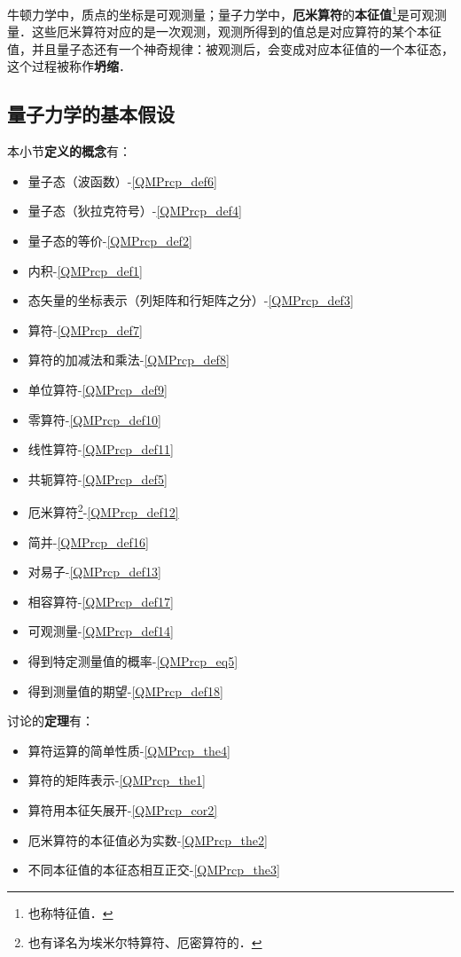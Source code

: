 牛顿力学中，质点的坐标是可观测量；量子力学中，\textbf{厄米算符}的\textbf{本征值}\footnote{也称特征值．}是可观测量．这些厄米算符对应的是一次观测，观测所得到的值总是对应算符的某个本征值，并且量子态还有一个神奇规律：被观测后，会变成对应本征值的一个本征态，这个过程被称作\textbf{坍缩}．



\subsection{量子力学的基本假设}\label{QMPrcp_sub2}

本小节\textbf{定义的概念}有：

\begin{itemize}
\item 量子态（波函数）-\autoref{QMPrcp_def6} 
\item 量子态（狄拉克符号）-\autoref{QMPrcp_def4} 
\item 量子态的等价-\autoref{QMPrcp_def2} 
\item 内积-\autoref{QMPrcp_def1} 
\item 态矢量的坐标表示（列矩阵和行矩阵之分）-\autoref{QMPrcp_def3} 
\item 算符-\autoref{QMPrcp_def7} 
\item 算符的加减法和乘法-\autoref{QMPrcp_def8} 
\item 单位算符-\autoref{QMPrcp_def9} 
\item 零算符-\autoref{QMPrcp_def10} 
\item 线性算符-\autoref{QMPrcp_def11} 
\item 共轭算符-\autoref{QMPrcp_def5} 
\item 厄米算符\footnote{也有译名为埃米尔特算符、厄密算符的．}-\autoref{QMPrcp_def12} 
\item 简并-\autoref{QMPrcp_def16} 
\item 对易子-\autoref{QMPrcp_def13} 
\item 相容算符-\autoref{QMPrcp_def17} 
\item 可观测量-\autoref{QMPrcp_def14} 
\item 得到特定测量值的概率-\autoref{QMPrcp_eq5} 
\item 得到测量值的期望-\autoref{QMPrcp_def18} 
\end{itemize}


讨论的\textbf{定理}有：

\begin{itemize}
\item 算符运算的简单性质-\autoref{QMPrcp_the4} 
\item 算符的矩阵表示-\autoref{QMPrcp_the1} 
\item 算符用本征矢展开-\autoref{QMPrcp_cor2} 
\item 厄米算符的本征值必为实数-\autoref{QMPrcp_the2} 
\item 不同本征值的本征态相互正交-\autoref{QMPrcp_the3} 
\end{itemize}

